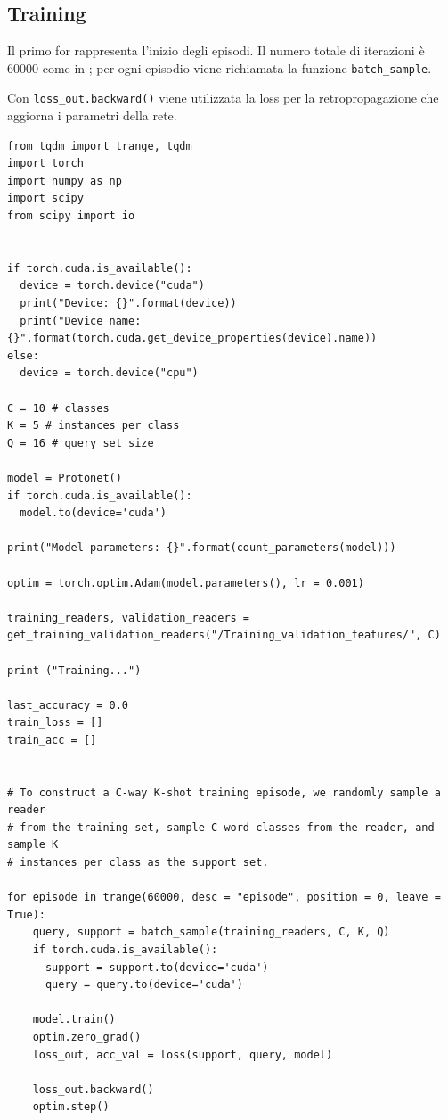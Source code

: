 \documentclass[12pt,a4paper,titlepage]{article}
\begin{document}
\subsection{Training}
Il primo for rappresenta l'inizio degli episodi.
Il numero totale di iterazioni è 60000 come in \cite{Salamon:Few-Shot}; per ogni episodio viene richiamata la funzione \texttt{batch\_sample}.

Con \texttt{loss\_out.backward()} viene utilizzata la loss per la retropropagazione che aggiorna i parametri della rete.

\begin{lstlisting}[language=iPython,firstnumber=1, caption=protonet\_training.py, label=protonet_training main,captionpos=b]
from tqdm import trange, tqdm
import torch
import numpy as np
import scipy
from scipy import io


if torch.cuda.is_available():
  device = torch.device("cuda")
  print("Device: {}".format(device))
  print("Device name: {}".format(torch.cuda.get_device_properties(device).name))
else:
  device = torch.device("cpu")

C = 10 # classes
K = 5 # instances per class
Q = 16 # query set size

model = Protonet()
if torch.cuda.is_available():
  model.to(device='cuda')

print("Model parameters: {}".format(count_parameters(model)))

optim = torch.optim.Adam(model.parameters(), lr = 0.001)

training_readers, validation_readers = get_training_validation_readers("/Training_validation_features/", C)

print ("Training...")

last_accuracy = 0.0
train_loss = []
train_acc = []


# To construct a C-way K-shot training episode, we randomly sample a reader 
# from the training set, sample C word classes from the reader, and sample K
# instances per class as the support set.

for episode in trange(60000, desc = "episode", position = 0, leave = True):
    query, support = batch_sample(training_readers, C, K, Q)
    if torch.cuda.is_available():
      support = support.to(device='cuda')
      query = query.to(device='cuda')
    
    model.train()
    optim.zero_grad()
    loss_out, acc_val = loss(support, query, model)

    loss_out.backward()
    optim.step()
    

\end{lstlisting}
\end{document}
